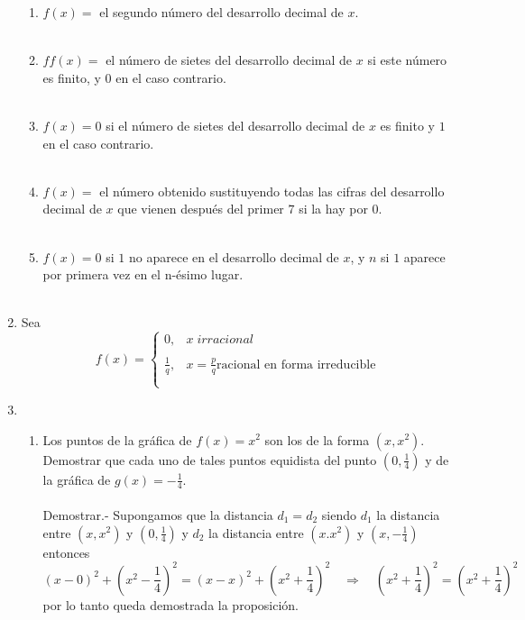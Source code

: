 \begin{enumerate}
\begin{enumerate}[\bfseries (i)]
	\item $f(x)=$ el segundo número del desarrollo decimal de $x$.\\\\

	\item $ff(x)=$ el número de sietes del desarrollo decimal de $x$ si este número es finito, y $0$ en el caso contrario.\\\\

	\item $f(x)=0$ si el número de sietes del desarrollo decimal de $x$ es finito y $1$ en el caso contrario.\\\\

	\item $f(x)=$ el número obtenido sustituyendo todas las cifras del desarrollo decimal de $x$ que vienen después del primer $7$ si la hay por $0$.\\\\

	\item $f(x)=0$ si $1$ no aparece en el desarrollo decimal de $x$, y $n$ si $1$ aparece por primera vez en el n-ésimo lugar.\\\\
    \end{enumerate}

    \item Sea $$f(x)=\left\{ \begin{array}{rl}
	0,&x \; irracional\\
	\\ \frac{1}{q},& x=\frac{p}{q} \mbox{racional en forma irreducible}\\\\
    \end{array}\right.$$

    \item
    \begin{enumerate}[\bfseries (a)]
	
	\item Los puntos de la gráfica de $f(x)=x^2$ son los de la forma $(x,x^2)$. Demostrar que cada uno de tales puntos equidista del punto $(0,\frac{1}{4})$ y de la gráfica de $g(x)=-\frac{1}{4}$.\\\\
	    Demostrar.-\; Supongamos que la distancia $d_1 = d_2$ siendo $d_1$ la distancia entre $(x,x^2)$ y $(0,\frac{1}{4})$ y $d_2$ la distancia entre $(x.x^2)$ y $(x,-\frac{1}{4})$ entonces $$(x-0)^2+\left(x^2-\frac{1}{4}\right)^2 = (x-x)^2 + \left(x^2+\frac{1}{4}\right)^2 \quad \Rightarrow \quad \left(x^2 + \frac{1}{4}\right)^2 = \left(x^2 + \frac{1}{4}\right)^2$$ por lo tanto queda demostrada la proposición.\\\\


\end{enumerate}
\end{enumerate}
